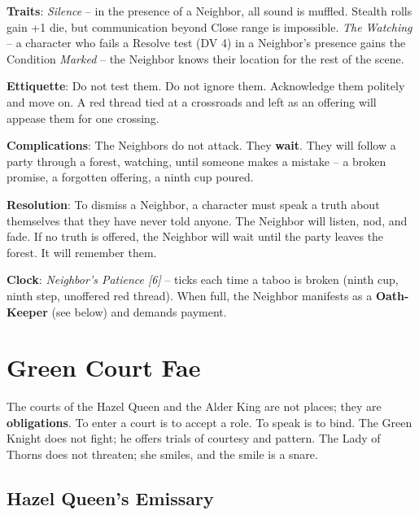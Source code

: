 \noindent\textbf{Traits}: 
\emph{Silence} -- in the presence of a Neighbor, all sound is muffled. Stealth rolls gain +1 die, but communication beyond Close range is impossible. \emph{The Watching} -- a character who fails a Resolve test (DV 4) in a Neighbor's presence gains the Condition \emph{Marked} -- the Neighbor knows their location for the rest of the scene.

\noindent\textbf{Ettiquette}: Do not test them. Do not ignore them. Acknowledge them politely and move on. A red thread tied at a crossroads and left as an offering will appease them for one crossing.

\noindent\textbf{Complications}: The Neighbors do not attack. They \textbf{wait}. They will follow a party through a forest, watching, until someone makes a mistake -- a broken promise, a forgotten offering, a ninth cup poured.

\noindent\textbf{Resolution}: To dismiss a Neighbor, a character must speak a truth about themselves that they have never told anyone. The Neighbor will listen, nod, and fade. If no truth is offered, the Neighbor will wait until the party leaves the forest. It will remember them.

\noindent\textbf{Clock}: \emph{Neighbor's Patience [6]} -- ticks each time a taboo is broken (ninth cup, ninth step, unoffered red thread). When full, the Neighbor manifests as a \textbf{Oath-Keeper} (see below) and demands payment.


\section*{Green Court Fae}

\noindent The courts of the Hazel Queen and the Alder King are not places; they are \textbf{obligations}. To enter a court is to accept a role. To speak is to bind. The Green Knight does not fight; he offers trials of courtesy and pattern. The Lady of Thorns does not threaten; she smiles, and the smile is a snare.

\subsection*{Hazel Queen's Emissary}

